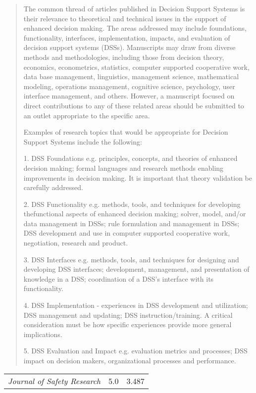 	\begin{quote}	
	The common thread of articles published in Decision Support Systems is their relevance to theoretical and technical issues in the support of enhanced decision making. The areas addressed may include foundations, functionality, interfaces, implementation, impacts, and evaluation of decision support systems (DSSs). Manuscripts may draw from diverse methods and methodologies, including those from decision theory, economics, econometrics, statistics, computer supported cooperative work, data base management, linguistics, management science, mathematical modeling, operations management, cognitive science, psychology, user interface management, and others. However, a manuscript focused on direct contributions to any of these related areas should be submitted to an outlet appropriate to the specific area.

Examples of research topics that would be appropriate for Decision Support Systems include the following:

1. DSS Foundations e.g. principles, concepts, and theories of enhanced decision making; formal languages and research methods enabling improvements in decision making. It is important that theory validation be carefully addressed.

2. DSS Functionality e.g. methods, tools, and techniques for developing thefunctional aspects of enhanced decision making; solver, model, and/or data management in DSSs; rule formulation and management in DSSs; DSS development and use in computer supported cooperative work, negotiation, research and product.

3. DSS Interfaces e.g. methods, tools, and techniques for designing and developing DSS interfaces; development, management, and presentation of knowledge in a DSS; coordination of a DSS's interface with its functionality.

4. DSS Implementation - experiences in DSS development and utilization; DSS management and updating; DSS instruction/training. A critical consideration must be how specific experiences provide more general implications.

5. DSS Evaluation and Impact e.g. evaluation metrics and processes; DSS impact on decision makers, organizational processes and performance.
	\end{quote}

\noindent\begin{tabular}{@{}p{4in}p{1in}p{1in}}
	\it Journal of Safety Research & 5.0 & 3.487 \cr
\end{tabular}

